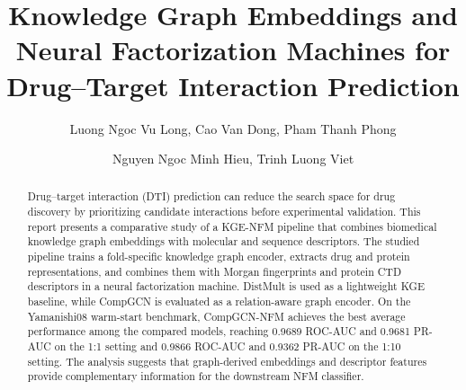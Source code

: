 \documentclass[sigconf,nonacm]{acmart}
\begin{document}
\title{Knowledge Graph Embeddings and Neural Factorization Machines for Drug--Target Interaction Prediction}

\author{Luong Ngoc Vu Long, Cao Van Dong, Pham Thanh Phong}
\author{Nguyen Ngoc Minh Hieu, Trinh Luong Viet}


\renewcommand{\shortauthors}{Group 15}

\begin{abstract}
Drug--target interaction (DTI) prediction can reduce the search space for drug discovery by prioritizing candidate interactions before experimental validation. This report presents a comparative study of a KGE-NFM pipeline that combines biomedical knowledge graph embeddings with molecular and sequence descriptors. The studied pipeline trains a fold-specific knowledge graph encoder, extracts drug and protein representations, and combines them with Morgan fingerprints and protein CTD descriptors in a neural factorization machine. DistMult is used as a lightweight KGE baseline, while CompGCN is evaluated as a relation-aware graph encoder. On the Yamanishi08 warm-start benchmark, CompGCN-NFM achieves the best average performance among the compared models, reaching 0.9689 ROC-AUC and 0.9681 PR-AUC on the 1:1 setting and 0.9866 ROC-AUC and 0.9362 PR-AUC on the 1:10 setting. The analysis suggests that graph-derived embeddings and descriptor features provide complementary information for the downstream NFM classifier.
\end{abstract}


\maketitle










\end{document}
